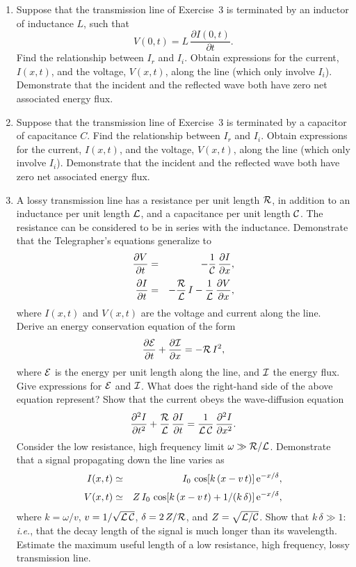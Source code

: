 {\begin{enumerate}
\item Suppose that the transmission line of Exercise~3 is terminated
by an inductor of inductance $L$, such that
$$
V(0,t)=L\,\frac{\partial  I(0,t)}{\partial t}.
$$
Find the relationship between $I_r$ and $I_i$. Obtain expressions for the current, $I(x,t)$, and the voltage, $V(x,t)$, along the line
(which only involve $I_i$). Demonstrate that  the incident and the reflected
wave both have zero net associated energy flux. 

 \item Suppose that the transmission line of Exercise~3 is terminated
by a capacitor of capacitance $C$. Find the relationship between $I_r$ and $I_i$. Obtain expressions for the current, $I(x,t)$, and the voltage, $V(x,t)$, along the line
(which only involve $I_i$). Demonstrate that  the incident and the reflected
wave both have zero net associated energy flux. 

\item A lossy transmission line  has a resistance per unit length ${\cal R}$,
in addition to an inductance per unit length ${\cal L}$, and a capacitance
per unit length ${\cal C}$. The resistance can be considered to be in series with the
inductance. Demonstrate that the Telegrapher's equations generalize to
\begin{eqnarray}
\frac{\partial V}{\partial t} &=&-\frac{1}{{\cal C}}\,\frac{\partial I}{\partial x},\nonumber\\[0.5ex]
\frac{\partial I}{\partial t} &=&-\frac{{\cal R}}{{\cal L}}\,I - \frac{1}{\cal L}\,\frac{\partial V}{\partial x}\nonumber,
\end{eqnarray}
where $I(x,t)$ and $V(x,t)$ are the voltage and current along the line. 
Derive an energy conservation equation of the form
$$
\frac{\partial{\cal E}}{\partial t} + \frac{\partial {\cal I}}{\partial x} =- {\cal R}\,I^2,
$$
where ${\cal E}$ is the energy per unit length along the line, and ${\cal I}$ the energy flux. 
Give expressions for ${\cal E}$ and ${\cal I}$. What does the right-hand side of the
above equation represent? Show that the current obeys the wave-diffusion equation
$$
\frac{\partial^2 I}{\partial t^2}+ \frac{{\cal R}}{{\cal L}}\,\frac{\partial I}{\partial t} = \frac{1}{{\cal L}\,{\cal C}}\,\frac{\partial^2 I}{\partial x^2}.
$$
 Consider the low resistance, high frequency limit $\omega\gg {\cal R}/{\cal L}$.
 Demonstrate that a signal propagating down the line varies
as
\begin{eqnarray}
I(x,t)& \simeq& I_0\,\cos[k\,(x-v\,t)]\,{\rm e}^{-x/\delta},\nonumber\\[0.5ex]
V(x,t)&\simeq &Z\,I_0\,\cos[k\,(x-v\,t)+1/(k\,\delta)]\,{\rm e}^{-x/\delta},\nonumber
\end{eqnarray}
where $k=\omega/v$, $v=1/\sqrt{{\cal L}\,{\cal C}}$, $\delta = 2\,Z/{\cal R}$, and
$Z=\sqrt{{\cal L}/{\cal C}}$. Show that $k\,\delta \gg 1$: {\em i.e.}, that the
decay length of the signal is much longer than its wavelength. Estimate the
maximum useful length of a low resistance, high frequency, lossy transmission line.


\end{enumerate}}
